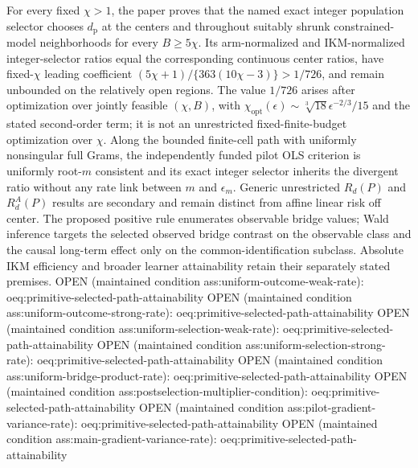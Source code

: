 For every fixed \(\chi>1\), the paper proves that the named exact integer population selector chooses \(d_{\mathrm p}\) at the centers and throughout suitably shrunk constrained-model neighborhoods for every \(B\ge5\chi\).  Its arm-normalized and IKM-normalized integer-selector ratios equal the corresponding continuous center ratios, have fixed-\(\chi\) leading coefficient \((5\chi+1)/\{363(10\chi-3)\}>1/726\), and remain unbounded on the relatively open regions.  The value \(1/726\) arises after optimization over jointly feasible \((\chi,B)\), with \(\chi_{\mathrm{opt}}(\epsilon)\sim\sqrt[3]{18}\epsilon^{-2/3}/15\) and the stated second-order term; it is not an unrestricted fixed-finite-budget optimization over \(\chi\).  Along the bounded finite-cell path with uniformly nonsingular full Grams, the independently funded pilot OLS criterion is uniformly root-\(m\) consistent and its exact integer selector inherits the divergent ratio without any rate link between \(m\) and \(\epsilon_m\).  Generic unrestricted \(R_d(P)\) and \(R_d^A(P)\) results are secondary and remain distinct from affine linear risk off center.  The proposed positive rule enumerates observable bridge values; Wald inference targets the selected observed bridge contrast on the observable class and the causal long-term effect only on the common-identification subclass.  Absolute IKM efficiency and broader learner attainability retain their separately stated premises.  OPEN (maintained condition ass:uniform-outcome-weak-rate): oeq:primitive-selected-path-attainability OPEN (maintained condition ass:uniform-outcome-strong-rate): oeq:primitive-selected-path-attainability OPEN (maintained condition ass:uniform-selection-weak-rate): oeq:primitive-selected-path-attainability OPEN (maintained condition ass:uniform-selection-strong-rate): oeq:primitive-selected-path-attainability OPEN (maintained condition ass:uniform-bridge-product-rate): oeq:primitive-selected-path-attainability OPEN (maintained condition ass:postselection-multiplier-condition): oeq:primitive-selected-path-attainability OPEN (maintained condition ass:pilot-gradient-variance-rate): oeq:primitive-selected-path-attainability OPEN (maintained condition ass:main-gradient-variance-rate): oeq:primitive-selected-path-attainability